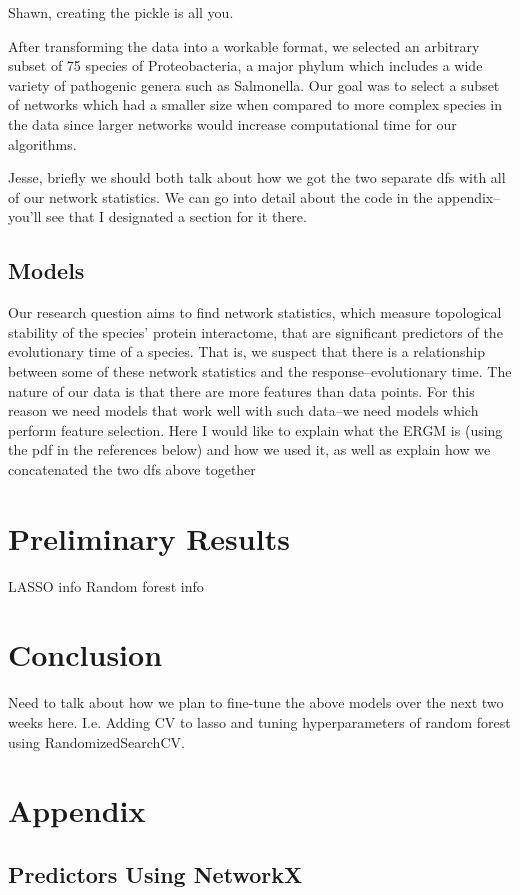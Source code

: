 \documentclass[12pt]{article}
\begin{document}
Shawn, creating the pickle is all you.

After transforming the data into a workable format, we selected an arbitrary subset of 75 species of Proteobacteria, a major phylum which includes a wide variety of pathogenic genera such as Salmonella. Our goal was to select a subset of networks which had a smaller size when compared to more complex species in the data since larger networks would increase computational time for our algorithms. 

Jesse, briefly we should both talk about how we got the two separate dfs with all of our network statistics. We can go into detail about the code in the appendix--you’ll see that I designated a section for it there. 


\subsection{Models}
Our research question aims to find network statistics, which measure topological stability of the species’ protein interactome, that are significant predictors of the evolutionary time of a species. That is, we suspect that there is a relationship between some of these network statistics and the response--evolutionary time. The nature of our data is that there are more features than data points. For this reason we need models that work well with such data--we need models which perform feature selection. 
Here I would like to explain what the ERGM is (using the pdf in the references below)   and how we used it, as well as explain how we concatenated the two dfs above together

\section{Preliminary Results}
LASSO info
Random forest info
\section{Conclusion}
Need to talk about how we plan to fine-tune the above models over the next two weeks here. I.e. Adding CV to lasso and tuning hyperparameters of random forest using RandomizedSearchCV.
\section{Appendix}
\subsection{Predictors Using NetworkX}
\end{document}
